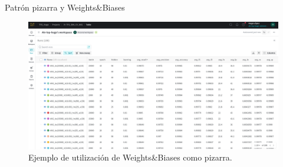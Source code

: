 \begin{frame}{Patrón pizarra y Weights\&Biases}
	\begin{figure}
		\centering
	    \includegraphics[width=\linewidth]{./img/wandb.png}
    		\caption{Ejemplo de utilización de Weights\&Biases como pizarra.}
	\end{figure}
\end{frame}




